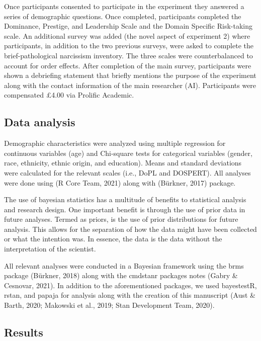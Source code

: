 \documentclass[
  donotrepeattitle,doc, 12pt, a4paper,floatsintext]{apa7}
\begin{document}
Once participants consented to participate in the experiment they answered a series of demographic questions. Once completed, participants completed the Dominance, Prestige, and Leadership Scale and the Domain Specific Risk-taking scale. An additional survey was added (the novel aspect of experiment 2) where participants, in addition to the two previous surveys, were asked to complete the brief-pathological narcissism inventory. The three scales were counterbalanced to account for order effects. After completion of the main survey, participants were shown a debriefing statement that briefly mentions the purpose of the experiment along with the contact information of the main researcher (AI). Participants were compensated £4.00 via Prolific Academic.

\hypertarget{data-analysis-3}{%
\subsection{Data analysis}\label{data-analysis-3}}

Demographic characteristics were analyzed using multiple regression for continuous variables (age) and Chi-square tests for categorical variables (gender, race, ethnicity, ethnic origin, and education). Means and standard deviations were calculated for the relevant scales (i.e., DoPL and DOSPERT). All analyses were done using (R Core Team, 2021) along with (Bürkner, 2017) package.

The use of bayesian statistics has a multitude of benefits to statistical analysis and research design. One important benefit is through the use of prior data in future analyses. Termed as priors, is the use of prior distributions for future analysis. This allows for the separation of how the data might have been collected or what the intention was. In essence, the data is the data without the interpretation of the scientist.

All relevant analyses were conducted in a Bayesian framework using the brms package (Bürkner, 2018) along with the cmdstanr packages notes (Gabry \& Cesnovar, 2021). In addition to the aforementioned packages, we used bayestestR, rstan, and papaja for analysis along with the creation of this manuscript (Aust \& Barth, 2020; Makowski et al., 2019; Stan Development Team, 2020).

\hypertarget{results-2}{%
\subsection{Results}\label{results-2}}
\end{document}
